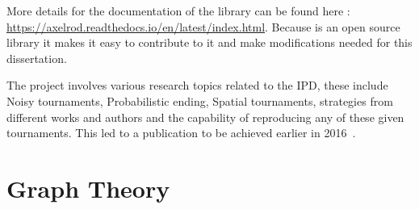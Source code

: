 More details for the documentation of the library can be found here :
\url{https://axelrod.readthedocs.io/en/latest/index.html}.
Because is an open source library it makes it easy to contribute to it and
make modifications needed for this dissertation.

The project involves various research topics related to the IPD, these include
Noisy tournaments, Probabilistic ending, Spatial tournaments, strategies from
different works and authors and the capability of reproducing any of these given
tournaments. This led to a publication to be achieved earlier in 2016~\cite{Knight2016}.

\section{Graph Theory}
